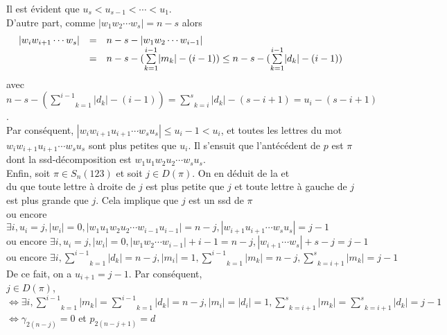 Il est évident que $u_s < u_{s-1}< \cdots < u_1$.\\
D'autre part, comme $|w_{1}w_{2}\cdots w_{s}| = n-s$ alors 
\[
	\begin{array}{l l l}
		|w_i w_{i+1} \cdots w_{s} | &=& n-s - |w_{1}w_{2}\cdots w_{i-1}|\\
		&=& n-s - (\underset{k=1}{\overset{i-1}{\sum}} |m_{k}| - (i-1)) \leq n-s - (\underset{k=1}{\overset{i-1}{\sum}} |d_{k}| - (i-1))\\
	\end{array}
\]
avec $n-s - (\underset{k=1}{\overset{i-1}{\sum}} |d_{k}| - (i-1))=\underset{k=i}{\overset{s}{\sum}} |d_{k}| - (s-i +1)= u_{i} - (s-i+1)$.\\
Par conséquent, $| w_{i}w_{i+1}u_{i+1}\cdots w_{s}u_{s} |\leq u_{i}-1< u_i$, et toutes les lettres du mot \\$w_{i} w_{i+1} u_{i+1} \cdots w_s u_s$ sont plus petites que $u_i$. Il s'ensuit que l'antécédent de $p$ est $\pi$ dont la ssd-décomposition est $w_1 u_1 w_2 u_2 \cdots w_s u_s$.\vspace{10pt}\\
Enfin, soit $\pi \in S_{n}(123)$ et soit $j \in D(\pi)$. On en déduit de la  et \\ du  que toute lettre à droite de $j$ est plus petite que $j$ et toute lettre à gauche de $j$ est plus grande que $j$. Cela implique que $j$ est un ssd de $\pi$\\ ou encore 
$ \exists i, u_i = j, |w_i | = 0, |w_1 u_1 w_2 u_2 \cdots w_{i-1} u_{i-1} | = n - j, |w_{i+1} u_{i+1} \cdots w_s u_s | = j - 1$\\
$\text{ou encore } \exists i, u_i = j, |w_i | = 0, |w_1  w_2  \cdots w_{i-1} | + i-1 = n - j, |w_{i+1} \cdots w_s | + s-j = j - 1$\\
$\text{ou encore } \exists i, \underset{k=1}{\overset{i-1}{\sum}}|d_{k}| = n-j , |m_{i}| = 1, \underset{k=1}{\overset{i-1}{\sum}}|m_{k}| = n-j, \underset{k=i+1}{\overset{s}{\sum}}|m_{k}| = j-1 $\\
De ce fait, on a $u_{i+1} = j - 1$. Par conséquent,\\ $j \in D(\pi)$, \\
$\iff \exists i, \underset{k=1}{\overset{i-1}{\sum}}|m_{k}| =\underset{k=1}{\overset{i-1}{\sum}}|d_{k}| =n-j, |m_{i}| = |d_{i}| = 1,  \underset{k=i+1}{\overset{s}{\sum}}|m_{k}| =  \underset{k=i+1}{\overset{s}{\sum}}|d_{k}|=j-1 $\\
$\iff \gamma_{2(n-j)}=0$ et $p_{2(n-j+1)}=d$

